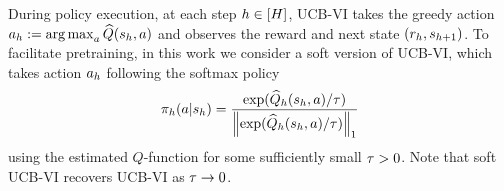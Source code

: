 During policy execution, at each step $h\in[{H}]$, UCB-VI takes the greedy action ${a}_h:=\operatorname*{arg\,max}_{{a}}{\widehat{{Q}}}({s}_h,{a})$ and observes the reward and next state $({r}_h,{s}_{h+1})$. To facilitate pretraining, in this work we consider a soft version of UCB-VI, which takes action ${a}_h$  following the softmax policy
\begin{align*}
{\pi}_h({a}|{s}_h)=\frac{\exp({\widehat{{Q}}}_h({s}_h,{a})/{\tau})}{\left\|{\exp({\widehat{{Q}}}_h({s}_h,{a})/{\tau})}\right\|_1}
\end{align*}
using the estimated $Q$-function for some sufficiently small ${\tau}>0$. Note that soft UCB-VI recovers UCB-VI as ${\tau}\to 0$.



















